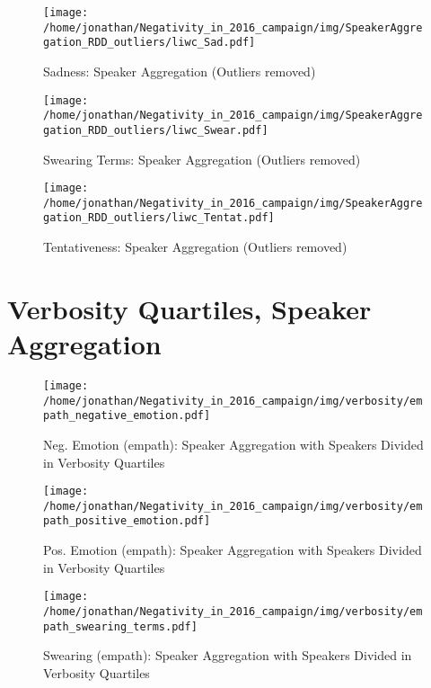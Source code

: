 \begin{figure}[h]\centering
\texttt{[image: /home/jonathan/Negativity\_in\_2016\_campaign/img/SpeakerAggregation\_RDD\_outliers/liwc\_Sad.pdf]}
\caption{Sadness: Speaker Aggregation (Outliers removed)}
\label{fig: sa_Sadness}
\end
{figure}

\begin{figure}[h]\centering
\texttt{[image: /home/jonathan/Negativity\_in\_2016\_campaign/img/SpeakerAggregation\_RDD\_outliers/liwc\_Swear.pdf]}
\caption{Swearing Terms: Speaker Aggregation (Outliers removed)}
\label{fig: sa_Swearing Terms}
\end
{figure}

\begin{figure}[h]\centering
\texttt{[image: /home/jonathan/Negativity\_in\_2016\_campaign/img/SpeakerAggregation\_RDD\_outliers/liwc\_Tentat.pdf]}
\caption{Tentativeness: Speaker Aggregation (Outliers removed)}
\label{fig: sa_Tentativeness}
\end
{figure}

\clearpage
\pagebreak

\section{Verbosity Quartiles, Speaker Aggregation}

\begin{figure}[h]\centering
\texttt{[image: /home/jonathan/Negativity\_in\_2016\_campaign/img/verbosity/empath\_negative\_emotion.pdf]}
\caption{Neg. Emotion (empath): Speaker Aggregation with Speakers Divided in Verbosity Quartiles}
\label{fig: verbosity_Neg. Emotion (empath)}
\end
{figure}

\begin{figure}[h]\centering
\texttt{[image: /home/jonathan/Negativity\_in\_2016\_campaign/img/verbosity/empath\_positive\_emotion.pdf]}
\caption{Pos. Emotion (empath): Speaker Aggregation with Speakers Divided in Verbosity Quartiles}
\label{fig: verbosity_Pos. Emotion (empath)}
\end
{figure}

\begin{figure}[h]\centering
\texttt{[image: /home/jonathan/Negativity\_in\_2016\_campaign/img/verbosity/empath\_swearing\_terms.pdf]}
\caption{Swearing (empath): Speaker Aggregation with Speakers Divided in Verbosity Quartiles}
\label{fig: verbosity_Swearing (empath)}
\end
{figure}

